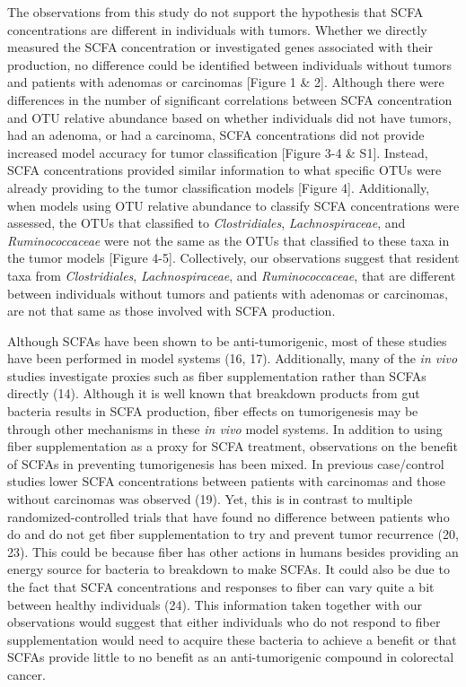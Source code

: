 \documentclass[11pt,]{article}
\begin{document}
The observations from this study do not support the hypothesis that SCFA
concentrations are different in individuals with tumors. Whether we
directly measured the SCFA concentration or investigated genes
associated with their production, no difference could be identified
between individuals without tumors and patients with adenomas or
carcinomas {[}Figure 1 \& 2{]}. Although there were differences in the
number of significant correlations between SCFA concentration and OTU
relative abundance based on whether individuals did not have tumors, had
an adenoma, or had a carcinoma, SCFA concentrations did not provide
increased model accuracy for tumor classification {[}Figure 3-4 \&
S1{]}. Instead, SCFA concentrations provided similar information to what
specific OTUs were already providing to the tumor classification models
{[}Figure 4{]}. Additionally, when models using OTU relative abundance
to classify SCFA concentrations were assessed, the OTUs that classified
to \emph{Clostridiales}, \emph{Lachnospiraceae}, and
\emph{Ruminococcaceae} were not the same as the OTUs that classified to
these taxa in the tumor models {[}Figure 4-5{]}. Collectively, our
observations suggest that resident taxa from \emph{Clostridiales},
\emph{Lachnospiraceae}, and \emph{Ruminococcaceae}, that are different
between individuals without tumors and patients with adenomas or
carcinomas, are not that same as those involved with SCFA production.

Although SCFAs have been shown to be anti-tumorigenic, most of these
studies have been performed in model systems (16, 17). Additionally,
many of the \emph{in vivo} studies investigate proxies such as fiber
supplementation rather than SCFAs directly (14). Although it is well
known that breakdown products from gut bacteria results in SCFA
production, fiber effects on tumorigenesis may be through other
mechanisms in these \emph{in vivo} model systems. In addition to using
fiber supplementation as a proxy for SCFA treatment, observations on the
benefit of SCFAs in preventing tumorigenesis has been mixed. In previous
case/control studies lower SCFA concentrations between patients with
carcinomas and those without carcinomas was observed (19). Yet, this is
in contrast to multiple randomized-controlled trials that have found no
difference between patients who do and do not get fiber supplementation
to try and prevent tumor recurrence (20, 23). This could be because
fiber has other actions in humans besides providing an energy source for
bacteria to breakdown to make SCFAs. It could also be due to the fact
that SCFA concentrations and responses to fiber can vary quite a bit
between healthy individuals (24). This information taken together with
our observations would suggest that either individuals who do not
respond to fiber supplementation would need to acquire these bacteria to
achieve a benefit or that SCFAs provide little to no benefit as an
anti-tumorigenic compound in colorectal cancer.
\end{document}
